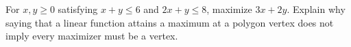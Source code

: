 For $x,y\ge0$ satisfying $x+y\le6$ and $2x+y\le8$, maximize $3x+2y$. Explain why saying that a linear function attains a maximum at a polygon vertex does not imply every maximizer must be a vertex.
